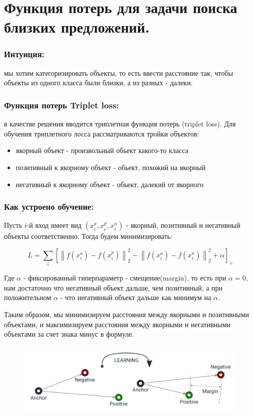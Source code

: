 \section*{Функция потерь для задачи поиска близких предложений.}

\subsubsection*{Интуиция:}
мы хотим категоризировать объекты, то есть ввести расстояние так, чтобы объекты из одного класса были близки, а из разных - далеки.

\subsubsection*{Функция потерь Triplet loss:}
в качестве решения вводится триплетная функция потерь (triplet loss).
Для обучения триплетного лосса рассматриваются тройки объектов:

\begin{itemize}
    \item якорный объект - произвольный обьект какого-то класса 
    \item позитивный к якорному объект - обьект, похожий на якорный
    \item негативный к якорному объект - обьект, далекий от якорного
\end{itemize}

\subsubsection*{Как устроено обучение:}

Пусть $i$-й вход имеет вид $(x_i^a, x_i^p, x_i^n)$ - якорный, позитивный и негативный объекты соответственно. Тогда будем минимизировать:

$$L = \sum\limits_i \left[\left \lVert f(x_i^a) - f(x_i^p) \right \rVert_2^2 - \left \lVert f(x_i^a) - f(x_i^n) \right \rVert_2^2 + \alpha \right]_+$$

Где $\alpha$ - фиксированный гиперпараметр - смещение(margin), то есть при $\alpha = 0$, нам достаточно что негативный объект дальше, чем позитивный, 
а при положительном $\alpha$ - что негативный объект дальше как минимум на $\alpha$.

Таким образом, мы минимизируем расстояния между якорными и позитивными объектами,
и максимизируем расстояния между якорными и негативными объектами за счет знака минус в формуле.

\begin{figure}[h]
    \centering
    \includegraphics[scale=0.5]{chapters/nonstandart_error/images/triplet_loss_learning.png}
\end{figure}

